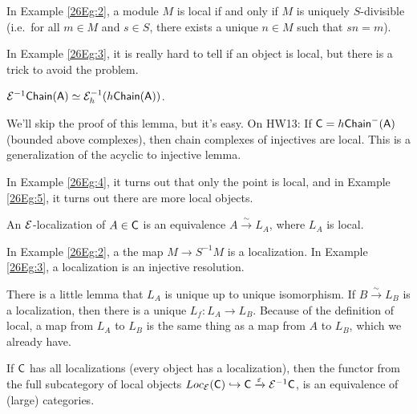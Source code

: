 In Example \ref{26Eg:2}, a module $M$ is local if and only if $M$ is uniquely $S$-divisible (i.e.~for all $m\in M$ and $s\in S$, there exists a unique $n\in M$ such that $sn=m$).

In Example \ref{26Eg:3}, it is really hard to tell if an object is local, but there is a trick to avoid the problem.
\begin{lemma}
 $\mathcal{E}^{-1}\text{\sf Chain}(\text{\sf A})\simeq \mathcal{E}^{-1}_h(h\text{\sf Chain}(\text{\sf A}))$.
\end{lemma}
We'll skip the proof of this lemma, but it's easy. On HW13: If $\text{\sf C}=h\text{\sf Chain}^-(\text{\sf A})$ (bounded above complexes), then chain complexes of injectives are local. This is a generalization of the acyclic to injective lemma.

In Example \ref{26Eg:4}, it turns out that only the point is local, and in Example \ref{26Eg:5}, it turns out there are more local objects.
\begin{definition}
 An $\mathcal{E}$-localization of $A\in \text{\sf C}$ is an equivalence $A\xrightarrow\sim L_A$, where $L_A$ is local.
\end{definition}
In Example \ref{26Eg:2}, a the map $M\to S^{-1}M$ is a localization. In Example \ref{26Eg:3}, a localization is an injective resolution.

There is a little lemma that $L_A$ is unique up to unique isomorphism. If $B\xrightarrow \sim L_B$ is a localization, then there is a unique $L_f\colon L_A\to L_B$. Because of the definition of local, a map from $L_A$ to $L_B$ is the same thing as a map from $A$ to $L_B$, which we already have.
\begin{theorem}
 If $\text{\sf C}$ has all localizations (every object has a localization), then the functor from the full subcategory of local objects $Loc_{\mathcal{E}}(\text{\sf C})\hookrightarrow \text{\sf C}\xrightarrow{\varepsilon} \mathcal{E}^{-1}\text{\sf C}$, is an equivalence of (large) categories.
\end{theorem}